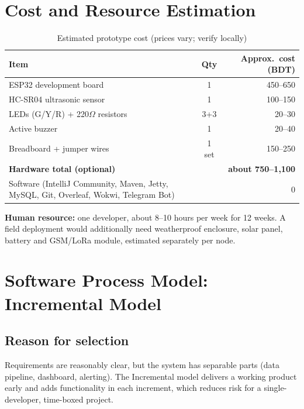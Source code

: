 \documentclass[12pt,a4paper]{article}
\begin{document}
\section{Cost and Resource Estimation}
\begin{table}[H]\centering\small
\begin{tabular}{@{}lcr@{}}
\toprule \textbf{Item} & \textbf{Qty} & \textbf{Approx.\ cost (BDT)}\\\midrule
ESP32 development board & 1 & 450--650\\
HC-SR04 ultrasonic sensor & 1 & 100--150\\
LEDs (G/Y/R) + 220$\Omega$ resistors & 3+3 & 20--30\\
Active buzzer & 1 & 20--40\\
Breadboard + jumper wires & 1 set & 150--250\\
\midrule \textbf{Hardware total (optional)} & & \textbf{about 750--1{,}100}\\
Software (IntelliJ Community, Maven, Jetty, MySQL, Git, Overleaf, Wokwi, Telegram Bot) & & 0\\\bottomrule
\end{tabular}
\caption{Estimated prototype cost (prices vary; verify locally)}
\end{table}
\noindent\textbf{Human resource:} one developer, about 8--10 hours per week for 12 weeks. A field deployment would additionally need weatherproof enclosure, solar panel, battery and GSM/LoRa module, estimated separately per node.

\section{Software Process Model: Incremental Model}
\subsection{Reason for selection}
Requirements are reasonably clear, but the system has separable parts (data pipeline, dashboard, alerting). The Incremental model delivers a working product early and adds functionality in each increment, which reduces risk for a single-developer, time-boxed project.
\end{document}

